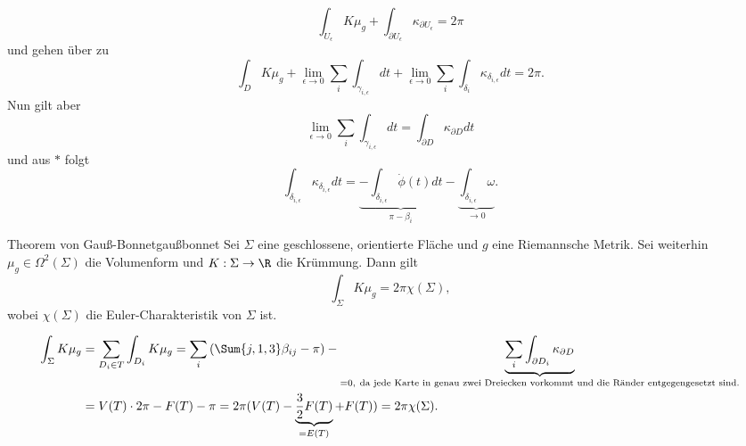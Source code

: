 \begin{beweis}
\begin{equation}
\int_{U_\epsilon} K \mu_g + \int_{\partial U_\epsilon} \kappa_{\partial U_\epsilon} = 2\pi
\end{equation}
und gehen über zu
\begin{equation}
\int_D K \mu_g + \lim_{\epsilon \to 0} \sum_i \int_{\gamma_{i,\epsilon}} dt + \lim_{\epsilon \to 0} \sum_i \int_{\delta_i} \kappa_{\delta_{i, \epsilon}} dt = 2 \pi.
\end{equation}
Nun gilt aber
\begin{equation}
\lim_{\epsilon \to 0} \sum_i \int_{\gamma_{i,\epsilon}} dt = \int_{\partial D} \kappa_{\partial D} dt
\end{equation}
und aus $\ast$ folgt
\begin{equation}
\int_{\delta_{i, \epsilon}} \kappa_{\delta_{i, \epsilon}} dt = \underbrace{- \int_{\delta_{i, \epsilon}} \dot{\phi}(t) dt}_{\pi - \beta_i} - \underbrace{\int_{\delta_{i, \epsilon}} \omega}_{\to 0}.
\end{equation}
\end{beweis}

\begin{theorem}{Theorem von Gauß-Bonnet}{gaußbonnet}
Sei $\Sigma$ eine geschlossene, orientierte Fläche und $g$ eine Riemannsche Metrik. Sei weiterhin $\mu_g \in \Omega^2(\Sigma)$ die Volumenform  und $K: \Sigma \to \R$ die Krümmung. Dann gilt
\begin{equation}
\int_\Sigma K \mu_g = 2 \pi \chi(\Sigma),
\end{equation}
wobei $\chi(\Sigma)$ die Euler-Charakteristik von $\Sigma$ ist.
\end{theorem}
\begin{beweis}
\begin{align}
\int_\Sigma K \mu_g &= \sum_{D_i \in T} \int_{D_i} K \mu_g = \sum_i \left(\Sum{j,1,3} \beta_{ij} - \pi \right) - \underbrace{\sum_i \int_{\partial D_i} \kappa_{\partial D}}_{=0, \ \text{da jede Karte in genau zwei Dreiecken vorkommt und die Ränder entgegengesetzt sind.}}\\
&= V(T) \cdot 2 \pi - F(T) - \pi = 2\pi (V(T)- \underbrace{\frac{3}{2} F(T)}_{=E(T)} + F(T)) = 2\pi \chi(\Sigma).
\end{align}
\end{beweis}